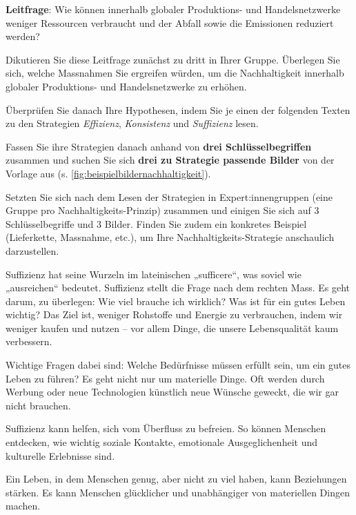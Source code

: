 \begin{myexercise}
    \textbf{Leitfrage}: Wie können innerhalb globaler Produktions- und Handelsnetzwerke weniger Ressourcen verbraucht und der Abfall sowie die Emissionen reduziert werden?

    Dikutieren Sie diese Leitfrage zunächst zu dritt in Ihrer Gruppe. Überlegen Sie sich, welche Massnahmen Sie ergreifen würden, um die Nachhaltigkeit innerhalb globaler Produktions- und Handelsnetzwerke zu erhöhen.

    Überprüfen Sie danach Ihre Hypothesen, indem Sie je einen der folgenden Texten zu den Strategien \textit{Effizienz}, \textit{Konsistenz} und \textit{Suffizienz} lesen.

    Fassen Sie ihre Strategien danach anhand von \textbf{drei Schlüsselbegriffen} zusammen und suchen Sie sich \textbf{drei zu Strategie passende Bilder} von der Vorlage aus (s. \cref{fig:beispielbildernachhaltigkeit}).

    Setzten Sie sich nach dem Lesen der Strategien in Expert:innengruppen (eine Gruppe pro Nachhaltigkeits-Prinzip) zusammen und einigen Sie sich auf 3 Schlüsselbegriffe und 3 Bilder. Finden Sie zudem ein konkretes Beispiel (Lieferkette, Massnahme, etc.), um Ihre Nachhaltigkeits-Strategie anschaulich darzustellen.

    \begin{textBox}[title = Suffizienz -- anders konsumieren für ein gutes Leben für alle \cite{suffizienz}]

        Suffizienz hat seine Wurzeln im lateinischen „sufficere“, was soviel wie „ausreichen“ bedeutet. Suffizienz stellt die Frage nach dem rechten Mass. Es geht darum, zu überlegen: Wie viel brauche ich wirklich? Was ist für ein gutes Leben wichtig? Das Ziel ist, weniger Rohstoffe und Energie zu verbrauchen, indem wir weniger kaufen und nutzen – vor allem Dinge, die unsere Lebensqualität kaum verbessern.

        Wichtige Fragen dabei sind: Welche Bedürfnisse müssen erfüllt sein, um ein gutes Leben zu führen? Es geht nicht nur um materielle Dinge. Oft werden durch Werbung oder neue Technologien künstlich neue Wünsche geweckt, die wir gar nicht brauchen.

        Suffizienz kann helfen, sich vom Überfluss zu befreien. So können Menschen entdecken, wie wichtig soziale Kontakte, emotionale Ausgeglichenheit und kulturelle Erlebnisse sind.

        Ein Leben, in dem Menschen genug, aber nicht zu viel haben, kann Beziehungen stärken. Es kann Menschen glücklicher und unabhängiger von materiellen Dingen machen.


\end{textBox}
\end{myexercise}
